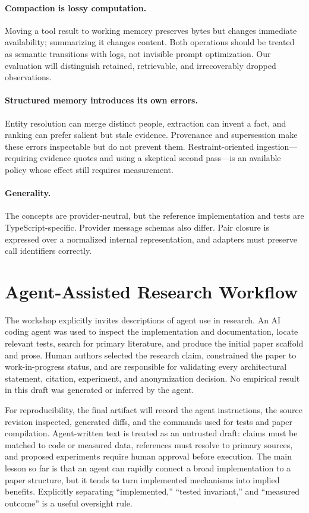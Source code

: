 \documentclass[sigplan,10pt,anonymous,review]{acmart}
\begin{document}
\paragraph{Compaction is lossy computation.}
Moving a tool result to working memory preserves bytes but changes immediate
availability; summarizing it changes content.  Both operations should be
treated as semantic transitions with logs, not invisible prompt optimization.
Our evaluation will distinguish retained, retrievable, and irrecoverably
dropped observations.

\paragraph{Structured memory introduces its own errors.}
Entity resolution can merge distinct people, extraction can invent a fact, and
ranking can prefer salient but stale evidence.  Provenance and supersession
make these errors inspectable but do not prevent them.  Restraint-oriented
ingestion---requiring evidence quotes and using a skeptical second pass---is an
available policy whose effect still requires measurement.

\paragraph{Generality.}
The concepts are provider-neutral, but the reference implementation and tests
are TypeScript-specific.  Provider message schemas also differ.  Pair closure
is expressed over a normalized internal representation, and adapters must
preserve call identifiers correctly.

\section{Agent-Assisted Research Workflow}

The workshop explicitly invites descriptions of agent use in research.  An AI
coding agent was used to inspect the implementation and documentation, locate
relevant tests, search for primary literature, and produce the initial paper
scaffold and prose.  Human authors selected the research claim, constrained
the paper to work-in-progress status, and are responsible for validating every
architectural statement, citation, experiment, and anonymization decision.
No empirical result in this draft was generated or inferred by the agent.

For reproducibility, the final artifact will record the agent instructions,
the source revision inspected, generated diffs, and the commands used for
tests and paper compilation.  Agent-written text is treated as an untrusted
draft: claims must be matched to code or measured data, references must resolve
to primary sources, and proposed experiments require human approval before
execution.  The main lesson so far is that an agent can rapidly connect a broad
implementation to a paper structure, but it tends to turn implemented
mechanisms into implied benefits.  Explicitly separating ``implemented,''
``tested invariant,'' and ``measured outcome'' is a useful oversight rule.
\end{document}
